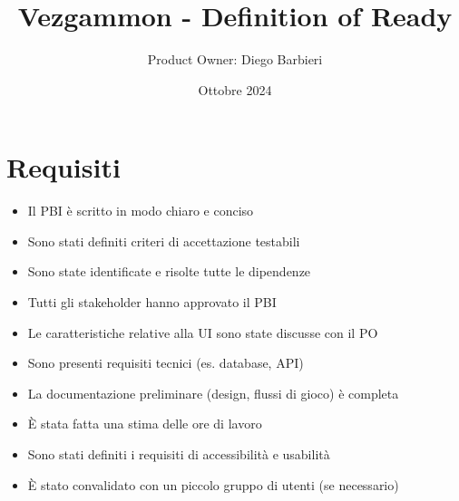 \documentclass{article}
\title{Vezgammon - Definition of Ready}
\author{Product Owner: Diego Barbieri}
\date{Ottobre 2024}
\begin{document}
\maketitle

\section{Requisiti}

\begin{itemize}
    \item Il PBI è scritto in modo chiaro e conciso
    \item Sono stati definiti criteri di accettazione testabili
    \item Sono state identificate e risolte tutte le dipendenze
    \item Tutti gli stakeholder hanno approvato il PBI
    \item Le caratteristiche relative alla UI sono state discusse con il PO
    \item Sono presenti requisiti tecnici (es. database, API)
    \item La documentazione preliminare (design, flussi di gioco) è completa
    \item È stata fatta una stima delle ore di lavoro
    \item Sono stati definiti i requisiti di accessibilità e usabilità
    \item È stato convalidato con un piccolo gruppo di utenti (se necessario)
\end{itemize}
\end{document}

